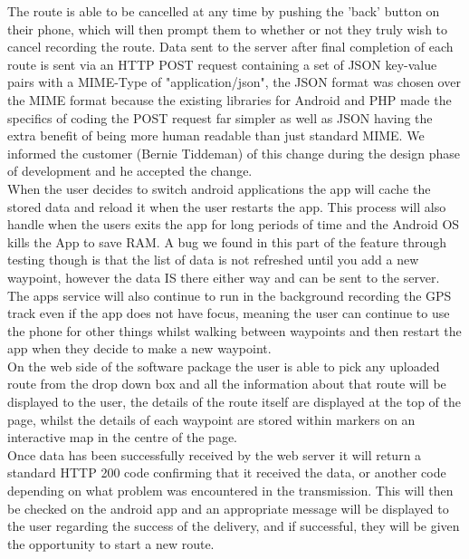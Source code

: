 \documentclass{article}
\begin{document}
		The route is able to be cancelled at any time by pushing the 'back' button on their phone, which will then prompt them to whether or not they truly wish to cancel recording the route. Data sent to the server after final completion of each route is sent via an HTTP POST request containing a set of JSON key-value pairs with a MIME-Type of "application/json", the JSON format was chosen over the MIME format because the existing libraries for Android and PHP made the specifics of coding the POST request far simpler as well as JSON having the extra benefit of being more human readable than just standard MIME. We informed the customer (Bernie Tiddeman) of this change during the design phase of development and he accepted the change. \\
		
		When the user decides to switch android applications the app will cache the stored data and reload it when the user restarts the app. This process will also handle when the users exits the app for long periods of time and the Android OS kills the App to save RAM. A bug we found in this part of the feature through testing though is that the list of data is not refreshed until you add a new waypoint, however the data IS there either way and can be sent to the server. The apps service will also continue to run in the background recording the GPS track even if the app does not have focus, meaning the user can continue to use the phone for other things whilst walking between waypoints and then restart the app when they decide to make a new waypoint. \\
		
		On the web side of the software package the user is able to pick any uploaded route from the drop down box and all the information about that route will be displayed to the user, the details of the route itself are displayed at the top of the page, whilst the details of each waypoint are stored within markers on an interactive map in the centre of the page. \\
		
		Once data has been successfully received by the web server it will return a standard HTTP 200 code confirming that it received the data, or another code depending on what problem was encountered in the transmission. This will then be checked on the android app and an appropriate message will be displayed to the user regarding the success of the delivery, and if successful, they will be given the opportunity to start a new route.

	\clearpage
\end{document}
